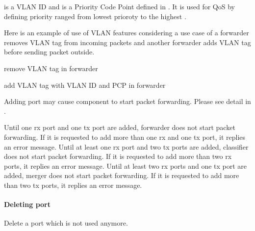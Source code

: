 \documentclass[a4paper,11pt,openany,oneside,english]{sphinxmanual}
\begin{document}
\begin{sphinxVerbatim}[commandchars=\\\{\},formatcom=\footnotesize]
\end{sphinxVerbatim}

 is a VLAN ID and  is a Priority Code Point defined in
.
It is used for QoS by defining priority ranged from lowest prioroty
 to the highest .

Here is an example of use of VLAN features considering a use case of
a forwarder removes VLAN tag from incoming packets and another forwarder
adds VLAN tag before sending packet outside.

\begin{sphinxVerbatim}[commandchars=\\\{\},formatcom=\footnotesize]
 remove VLAN tag in forwarder 

 add VLAN tag with VLAN ID and PCP in forwarder 
\end{sphinxVerbatim}

Adding port may cause component to start packet forwarding. Please see
detail in
{\hyperref[\detokenize{design/spp_secondary:spp-design-spp-sec-vf}]{}}.

Until one rx port and one tx port are added, forwarder does not start packet
forwarding. If it is requested to add more than one rx and one tx port, it
replies an error message.
Until at least one rx port and two tx ports are added, classifier does not
start packet forwarding. If it is requested to add more than two rx ports, it
replies an error message.
Until at least two rx ports and one tx port are added, merger does not start
packet forwarding. If it is requested to add more than two tx ports, it replies
an error message.


\paragraph{Deleting port}
\label{\detokenize{commands/secondary/spp_vf:deleting-port}}
Delete a port which is not used anymore.
\end{document}
